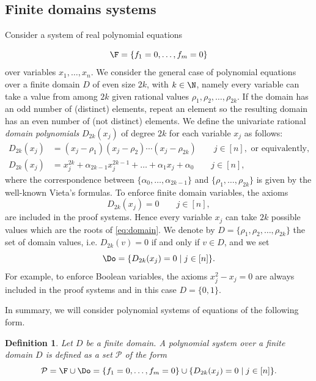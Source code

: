 \documentclass[11pt]{article}
\newtheorem{definition}[theorem]{Definition}
\begin{document}
\subsection{Finite domains systems}
Consider a system of real polynomial equations

\begin{equation}\label{eq:Psystem}
\F=\{f_1=0,\ldots,f_m=0\}    
\end{equation}
over variables $x_1,\ldots,x_n$.
We consider the general case of polynomial equations over a finite domain $D$ of even size $2k$, with $k\in \N$, namely every variable can take a value from among $2k$ given rational values $\rho_{1},\rho_{2},\ldots,\rho_{2k}$. If the domain has an odd number of (distinct) elements, repeat an element so the resulting domain has an even number of (not distinct) elements.
We define the univariate rational \emph{domain polynomials} $D_{2k}(x_j)$ of degree $2k$ for each variable $x_j$ as follows: 
\begin{align}
D_{2k}(x_j)&=(x_j-\rho_{1})(x_j-\rho_{2})\cdots (x_j-\rho_{2k}) \qquad j\in[n], \textrm{ or equivalently,}    \label{eq:domain_f_roots}\\
D_{2k}(x_j)&=x_j^{2k}+\alpha_{2k-1}x_j^{2k-1}+\dots + \alpha_1 x_j + \alpha_0 \qquad j\in[n], \label{eq:domain_f}   
\end{align}
where the correspondence between $\{\alpha_0,\ldots,\alpha_{2k-1}\}$ and $\{\rho_1,\ldots,\rho_{2k}\}$ is given by the well-known Vieta's formulas.
To enforce finite domain variables, the axioms
%
\begin{equation}\label{eq:domain}
D_{2k}(x_j)=0 \qquad j\in[n],    
\end{equation}
%
are included in the proof systems. 
%
Hence every variable $x_j$ can take $2k$ possible values which are the roots of \cref{eq:domain}. We denote by $D=\{\rho_1, \rho_2, \dots, \rho_{2k}\}$ the set of domain values, i.e. $D_{2k}(v)=0$ if and only if $v\in D$, and we set
%
\begin{equation}\label{eq:D}
    \Do=\{D_{2k}(x_j)=0\mid j\in[n]\}.
\end{equation}
For example, to enforce Boolean variables, the axioms $x^2_j - x_j=0$ are always included in the proof systems and in this case $D=\{0,1\}$. 

In summary, we will consider polynomial systems of equations of the following form.

\begin{definition}
    Let $D$ be a finite domain. A \emph{polynomial system over a finite domain $D$} is defined as a set $\mathcal{P}$ of the form
    \begin{equation}\label{eq:axiomsF}
        \mathcal{P} = \F \cup \Do =\{f_1=0,\ldots,f_m=0\} \cup \{D_{2k}(x_j)=0\mid j\in[n]\}.
    \end{equation}
\end{definition}
\end{document}
